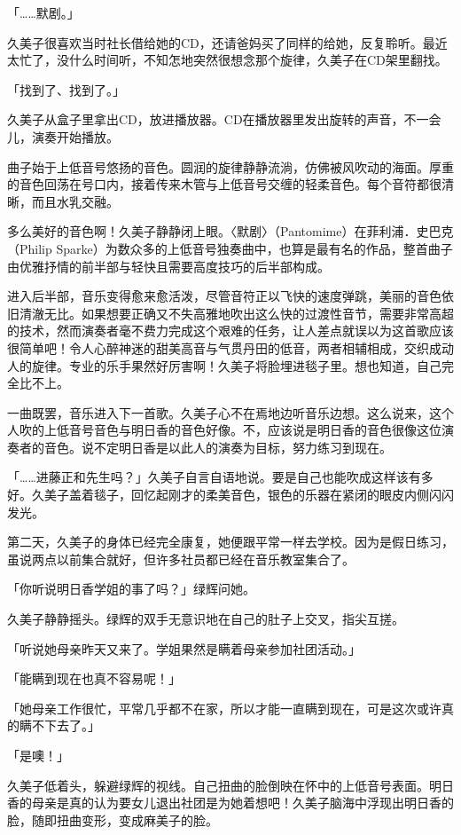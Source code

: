 \documentclass[UTF8]{ctexart}
\begin{document}
    「……默剧。」 

    久美子很喜欢当时社长借给她的CD，还请爸妈买了同样的给她，反复聆听。最近太忙了，没什么时间听，不知怎地突然很想念那个旋律，久美子在CD架里翻找。 

    「找到了、找到了。」 

    久美子从盒子里拿出CD，放进播放器。CD在播放器里发出旋转的声音，不一会儿，演奏开始播放。 

    曲子始于上低音号悠扬的音色。圆润的旋律静静流淌，仿佛被风吹动的海面。厚重的音色回荡在号口内，接着传来木管与上低音号交缠的轻柔音色。每个音符都很清晰，而且水乳交融。 

    多么美好的音色啊！久美子静静闭上眼。〈默剧〉（Pantomime）在菲利浦．史巴克（Philip Sparke）为数众多的上低音号独奏曲中，也算是最有名的作品，整首曲子由优雅抒情的前半部与轻快且需要高度技巧的后半部构成。 

    进入后半部，音乐变得愈来愈活泼，尽管音符正以飞快的速度弹跳，美丽的音色依旧清澈无比。如果想要正确又不失高雅地吹出这么快的过渡性音节，需要非常高超的技术，然而演奏者毫不费力完成这个艰难的任务，让人差点就误以为这首歌应该很简单吧！令人心醉神迷的甜美高音与气贯丹田的低音，两者相辅相成，交织成动人的旋律。专业的乐手果然好厉害啊！久美子将脸埋进毯子里。想也知道，自己完全比不上。 

    一曲既罢，音乐进入下一首歌。久美子心不在焉地边听音乐边想。这么说来，这个人吹的上低音号音色与明日香的音色好像。不，应该说是明日香的音色很像这位演奏者的音色。说不定明日香是以此人的演奏为目标，努力练习到现在。 

    「……进藤正和先生吗？」久美子自言自语地说。要是自己也能吹成这样该有多好。久美子盖着毯子，回忆起刚才的柔美音色，银色的乐器在紧闭的眼皮内侧闪闪发光。 

    第二天，久美子的身体已经完全康复，她便跟平常一样去学校。因为是假日练习，虽说两点以前集合就好，但许多社员都已经在音乐教室集合了。 

    「你听说明日香学姐的事了吗？」绿辉问她。 

    久美子静静摇头。绿辉的双手无意识地在自己的肚子上交叉，指尖互搓。 

    「听说她母亲昨天又来了。学姐果然是瞒着母亲参加社团活动。」 

    「能瞒到现在也真不容易呢！」 

    「她母亲工作很忙，平常几乎都不在家，所以才能一直瞒到现在，可是这次或许真的瞒不下去了。」 

    「是噢！」 

    久美子低着头，躲避绿辉的视线。自己扭曲的脸倒映在怀中的上低音号表面。明日香的母亲是真的认为要女儿退出社团是为她着想吧！久美子脑海中浮现出明日香的脸，随即扭曲变形，变成麻美子的脸。 
\end{document}
